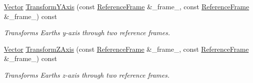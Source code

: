 \begin{DoxyCompactItemize}
\hyperlink{classosse_1_1collaborate_1_1_vector}{Vector} \hyperlink{classosse_1_1collaborate_1_1_reference_frame_a7f321d33340f957142db898ce6d91b7a}{Transform\+Y\+Axis} (const \hyperlink{classosse_1_1collaborate_1_1_reference_frame}{Reference\+Frame} \&\+\_\+frame\+\_, const \hyperlink{classosse_1_1collaborate_1_1_reference_frame}{Reference\+Frame} \&\+\_\+frame\+\_) const
\begin{DoxyCompactList}\small\item\em Transforms Earth\textquotesingle{}s y-\/axis through two reference frames. \end{DoxyCompactList}\item 
\hyperlink{classosse_1_1collaborate_1_1_vector}{Vector} \hyperlink{classosse_1_1collaborate_1_1_reference_frame_a2b99f8d49fc9c61b8dc98118469aeb38}{Transform\+Z\+Axis} (const \hyperlink{classosse_1_1collaborate_1_1_reference_frame}{Reference\+Frame} \&\+\_\+frame\+\_, const \hyperlink{classosse_1_1collaborate_1_1_reference_frame}{Reference\+Frame} \&\+\_\+frame\+\_) const
\begin{DoxyCompactList}\small\item\em Transforms Earth\textquotesingle{}s z-\/axis through two reference frames. \end{DoxyCompactList}\end{DoxyCompactItemize}
